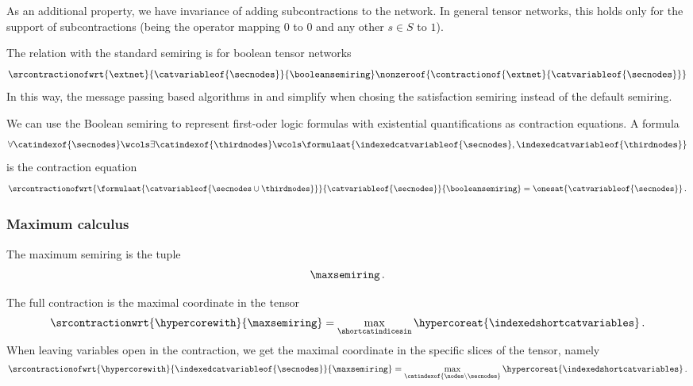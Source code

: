 As an additional property, we have invariance of adding subcontractions to the network.
In general tensor networks, this holds only for the support of subcontractions (being the operator mapping $0$ to $0$ and any other $s\in S$ to $1$).

The relation with the standard semiring is for boolean tensor networks
\begin{align*}
    \srcontractionofwrt{\extnet}{\catvariableof{\secnodes}}{\booleansemiring}
    \nonzeroof{\contractionof{\extnet}{\catvariableof{\secnodes}}}
\end{align*}
In this way, the message passing based algorithms in  and  simplify when chosing the satisfaction semiring instead of the default semiring.


We can use the Boolean semiring to represent first-oder logic formulas with existential quantifications as contraction equations.
A formula
\begin{align*}
    \forall \catindexof{\secnodes} \wcols \exists \catindexof{\thirdnodes} \wcols \formulaat{\indexedcatvariableof{\secnodes},\indexedcatvariableof{\thirdnodes}}
\end{align*}
is the contraction equation
\begin{align*}
    \srcontractionofwrt{\formulaat{\catvariableof{\secnodes\cup\thirdnodes}}}{\catvariableof{\secnodes}}{\booleansemiring}
    = \onesat{\catvariableof{\secnodes}} \, .
\end{align*}

\subsubsection{Maximum calculus}

The maximum semiring is the tuple
\begin{align*}
    \maxsemiring
    \, .
\end{align*}

The full contraction is the maximal coordinate in the tensor
\begin{align*}
    \srcontractionwrt{\hypercorewith}{\maxsemiring}
    = \max_{\shortcatindicesin} \hypercoreat{\indexedshortcatvariables} \, .
\end{align*}
When leaving variables open in the contraction, we get the maximal coordinate in the specific slices of the tensor, namely
\begin{align*}
    \srcontractionofwrt{\hypercorewith}{\indexedcatvariableof{\secnodes}}{\maxsemiring}
    = \max_{\catindexof{\nodes\backslash\secnodes}} \hypercoreat{\indexedshortcatvariables} \, .
\end{align*}

